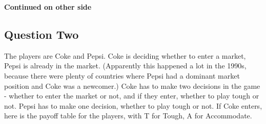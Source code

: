 \documentclass[
  11pt,
]{article}
\begin{document}
\textbf{Continued on other side}

\newpage

\hypertarget{question-two}{%
\subsection{Question Two}\label{question-two}}

The players are Coke and Pepsi. Coke is deciding whether to enter a
market, Pepsi is already in the market. (Apparently this happened a lot
in the 1990s, because there were plenty of countries where Pepsi had a
dominant market position and Coke was a newcomer.) Coke has to make two
decisions in the game - whether to enter the market or not, and if they
enter, whether to play tough or not. Pepsi has to make one decision,
whether to play tough or not. If Coke enters, here is the payoff table
for the players, with T for Tough, A for Accommodate.

 
  \providecommand{\huxb}[2]{\arrayrulecolor[RGB]{#1}\global\arrayrulewidth=#2pt}
  \providecommand{\huxvb}[2]{\color[RGB]{#1}\vrule width #2pt}
  \providecommand{\huxtpad}[1]{\rule{0pt}{#1}}
  \providecommand{\huxbpad}[1]{\rule[-#1]{0pt}{#1}}
\end{document}
